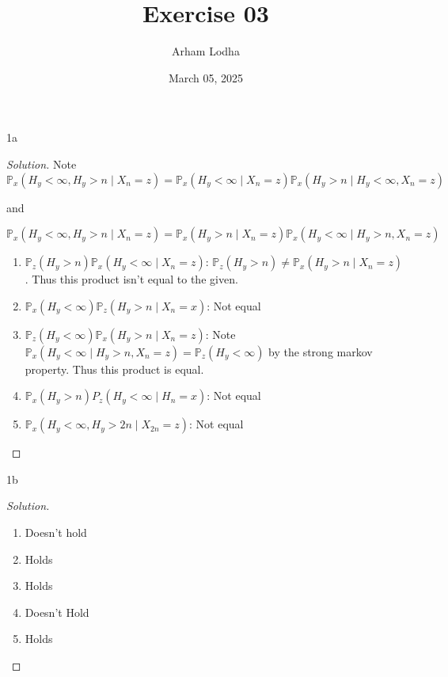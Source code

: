 \documentclass{article}
\newcommand{\PR}{\mathbb{P}}
\newenvironment{solution}
{\renewcommand\qedsymbol{$\blacksquare$}\begin{proof}[Solution]}
{\end{proof}}
\begin{document}
\title{Exercise 03}
\author{Arham Lodha}%
\date{March 05, 2025}%
\maketitle

\begin{PROB}{1a}\label{Problem 1a.}
\end{PROB}
\begin{solution}
    Note 
    \[\PR_x(H_y < \infty, H_y > n \mid X_n = z) = \PR_x(H_y < \infty \mid X_n = z) \PR_x(H_y > n \mid H_y < \infty, X_n = z)\]

    and 

    \[\PR_x(H_y < \infty, H_y > n \mid X_n = z) = \PR_x(H_y > n \mid X_n = z) \PR_x(H_y < \infty \mid H_y > n, X_n = z)\]

    \begin{enumerate}
        \item $\PR_{z}(H_y > n) \PR_{x}(H_y < \infty \mid X_n = z)$: $\PR_{z}(H_y > n) \neq \PR_x(H_y > n \mid X_n = z)$. Thus this product isn't equal to the given. 
        \item $\PR_x(H_y < \infty)\PR_z(H_y > n \mid X_n = x)$: Not equal
        \item $\PR_z(H_y < \infty) \PR_x(H_y > n \mid X_n = z)$: Note $\PR_x(H_y < \infty \mid H_y > n, X_n = z) = \PR_z(H_y < \infty)$ by the strong markov property. Thus this product is equal.
        \item $\PR_x(H_y > n)P_z(H_y < \infty \mid H_n = x)$: Not equal
        \item $\PR_x(H_y < \infty, H_y > 2n \mid X_{2n} = z)$: Not equal     
    \end{enumerate}
    
\end{solution}

\begin{PROB}{1b}\label{Problem 1b.}
\end{PROB}
\begin{solution}
    \begin{enumerate}
        \item Doesn't hold
        \item Holds
        \item Holds
        \item Doesn't Hold
        \item Holds
    \end{enumerate}
    
\end{solution}
\end{document}
